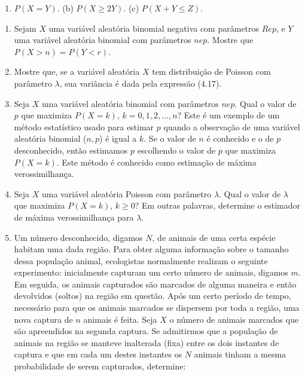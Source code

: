 \documentclass[
  10pt,
]{article}
\providecommand{\tightlist}{%
  \setlength{\itemsep}{0pt}\setlength{\parskip}{0pt}}
\begin{document}
\begin{enumerate}
\def\labelenumi{(\alph{enumi})}
\tightlist
\item
  \(P(X = Y)\). (b) \(P(X \geq 2Y)\). (c) \(P(X + Y \leq Z)\).
\end{enumerate}

\begin{enumerate}
\def\labelenumi{\arabic{enumi}.}
\setcounter{enumi}{36}
\item
  Sejam \(X\) uma variável aleatória binomial negativa com parâmetros
  \(R e p\), e \(Y\) uma variável aleatória binomial com parâmetros
  \(n e p\). Mostre que \(P(X > n) = P(Y < r)\).
\item
  Mostre que, se a variável aleatória \(X\) tem distribuição de Poisson
  com parâmetro \(\lambda\), sua variância é dada pela expressão (4.17).
\item
  Seja \(X\) uma variável aleatória binomial com parâmetros \(n e p\).
  Qual o valor de \(p\) que maximiza \(P(X = k)\),
  \(k = 0, 1, 2, \ldots, n\)? Este é um exemplo de um método estatístico
  usado para estimar \(p\) quando a observação de uma variável aleatória
  binomial (\(n, p\)) é igual a \(k\). Se o valor de \(n\) é conhecido e
  o de \(p\) desconhecido, então estimamos \(p\) escolhendo o valor de
  \(p\) que maximiza \(P(X = k)\). Este método é conhecido como
  estimação de máxima verossimilhança.
\item
  Seja \(X\) uma variável aleatória Poisson com parâmetro \(\lambda\).
  Qual o valor de \(\lambda\) que maximiza \(P(X = k)\), \(k \geq 0\)?
  Em outras palavras, determine o estimador de máxima verossimilhança
  para \(\lambda\).
\item
  Um número desconhecido, digamos \(N\), de animais de uma certa espécie
  habitam uma dada região. Para obter alguma informação sobre o tamanho
  dessa população animal, ecologistas normalmente realizam o seguinte
  experimento: inicialmente capturam um certo número de animais, digamos
  \(m\). Em seguida, os animais capturados são marcados de alguma
  maneira e então devolvidos (soltos) na região em questão. Após um
  certo período de tempo, necessário para que os animais marcados se
  dispersem por toda a região, uma nova captura de \(n\) animais é
  feita. Seja \(X\) o número de animais marcados que são apreendidos na
  segunda captura. Se admitirmos que a população de animais na região se
  manteve inalterada (fixa) entre os dois instantes de captura e que em
  cada um destes instantes os \(N\) animais tinham a mesma probabilidade
  de serem capturados, determine:\\
\end{enumerate}
\end{document}
